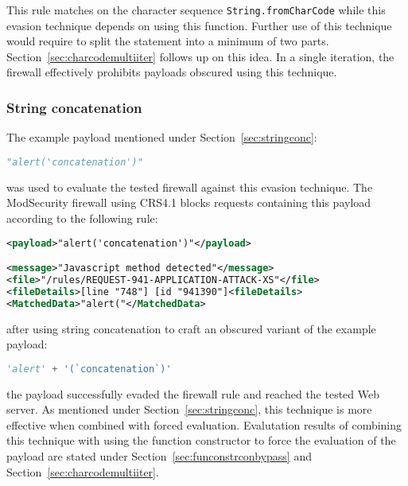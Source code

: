 This rule matches on the character sequence \verb|String.fromCharCode| while this evasion technique depends on using this function. Further use of this technique would require to split the statement into a minimum of two parts. Section~\ref{sec:charcodemultiiter} follows up on this idea. In a single iteration, the firewall effectively prohibits payloads obscured using this technique.

\subsubsection{String concatenation}
\label{sec:stringconcsingleiter}
The example payload mentioned under Section~\ref{sec:stringconc}:

\begin{lstlisting}[style=basicStyle, language=Python]
"alert('concatenation')"
\end{lstlisting}

was used to evaluate the tested firewall against this evasion technique. The ModSecurity firewall using CRS4.1 blocks requests containing this payload according to the following rule:

\begin{lstlisting}[style=ruleStyle, language=XML, caption=fromCharCode blocked, label={lst:fromcharcodeblocked}]
<payload>"alert('concatenation')"</payload>

<message>"Javascript method detected"</message>
<file>"/rules/REQUEST-941-APPLICATION-ATTACK-XS"</file>
<fileDetails>[line "748"] [id "941390"]<fileDetails>
<MatchedData>"alert("</MatchedData>
\end{lstlisting}

after using string concatenation to craft an obscured variant of the example payload:

\begin{lstlisting}[style=basicStyle, language=Python, caption='alert' + '(`concatenation`)' bypass, label={lst:strconcbypass}]
'alert' + '(`concatenation`)'
\end{lstlisting}

the payload successfully evaded the firewall rule and reached the tested Web server. As mentioned under Section~\ref{sec:stringconc}, this technique is more effective when combined with forced evaluation. Evalutation results of combining this technique with using the function constructor to force the evaluation of the payload are stated under Section~\ref{sec:funconstrconbypass} and Section~\ref{sec:charcodemultiiter}.


